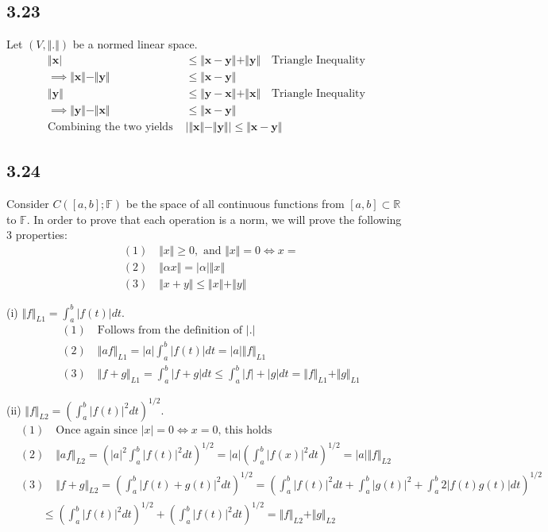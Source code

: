 \documentclass{article}
\begin{document}
	\subsection*{3.23}
	Let $(V, \Vert. \Vert)$ be a normed linear space.
	\begin{align*}
	\Vert \mathbf{x} \vert &\leq \Vert \mathbf{x} - \mathbf{y} \Vert + \Vert \mathbf{y} \Vert \quad \text{Triangle Inequality} \\
	\implies \Vert \mathbf{x} \Vert - \Vert \mathbf{y} \Vert &\leq \Vert \mathbf{x} - \mathbf{y} \Vert \\
	\Vert \mathbf{y} \Vert &\leq \Vert \mathbf{y} - \mathbf{x} \Vert + \Vert \mathbf{x} \Vert \quad \text{Triangle Inequality} \\
	\implies \Vert \mathbf{y} \Vert - \Vert \mathbf{x} \Vert &\leq \Vert \mathbf{x} - \mathbf{y} \Vert \\
	\text{Combining the two yields }
	&| \Vert \mathbf{x} \Vert - \Vert \mathbf{y} \Vert | \leq \Vert \mathbf{x} - \mathbf{y} \Vert
	\end{align*}
	
	\subsection*{3.24}
	Consider $C([a,b];\mathbb{F})$ be the space of all continuous functions from $[a,b] \subset \mathbb{R}$ to $\mathbb{F}$. In order to prove that each operation is a norm, we will prove the following 3 properties: 
	\begin{align*}
	&(1) \quad \Vert x \Vert \geq 0, \text{ and } \Vert x \Vert = 0 \iff x = \\
	&(2) \quad \Vert \alpha x \Vert = |\alpha| \Vert x \Vert \\
	&(3) \quad \Vert x + y \Vert \leq \Vert x \Vert + \Vert y \Vert
	\end{align*} 
	
	(i) $ \Vert f \Vert_{L1} = \int_{a}^{b} | f(t) | dt$. 
	\begin{align*}
	&(1) \quad \text{Follows from the definition of $|.|$} \\
	&(2) \quad \Vert af \Vert_{L1} = |a| \int_{a}^{b} |f(t)| dt = |a| \Vert f \Vert_{L1} \\
	&(3) \quad \Vert f + g \Vert_{L1} = \int_{a}^{b} |f + g | dt \leq \int_{a}^{b} |f| + |g| dt = \Vert f \Vert_{L1} + \Vert g \Vert_{L1}
	\end{align*}
	
	(ii) $\Vert f \Vert_{L2} = (\int_{a}^{b} |f(t)|^2 dt)^{1/2}$.
	\begin{align*}
	&(1) \quad \text{Once again since $|x| = 0 \iff x = 0$, this holds} \\
	&(2) \quad \Vert af \Vert_{L2} = (|a|^2 \int_{a}^{b}|f(t)|^2 dt)^{1/2} = |a| (\int_{a}^{b} |f(x)|^2 dt)^{1/2} = |a| \Vert f \Vert_{L2} \\
	&(3) \quad \Vert f + g \Vert_{L2} = (\int_{a}^{b} |f(t) + g(t)|^2 dt)^{1/2} = (\int_{a}^{b} |f(t)|^2 dt + \int_{a}^{b} |g(t)|^2 + \int_{a}^{b} 2|f(t)g(t)| dt)^{1/2} \\
	& \quad \quad \leq (\int_{a}^{b} |f(t)|^2 dt)^{1/2} + (\int_{a}^{b} |f(t)|^2 dt)^{1/2} = \Vert f \Vert_{L2} + \Vert g \Vert_{L2}
	\end{align*}
	
\end{document}
